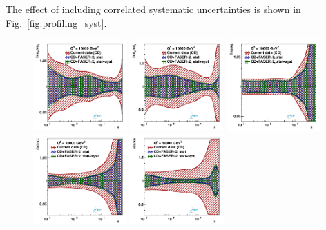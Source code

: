 %
The effect of including correlated systematic uncertainties is shown in 
Fig.~\ref{fig:profiling_syst}.
\begin{figure}[t]
\centering
\includegraphics[width=0.32\textwidth]{plots/proton_fasernu2/inclusive+charm_chargediscrimination/syst_FASERv2_q2_10000_pdf_uv_ratio.pdf}
\includegraphics[width=0.32\textwidth]{plots/proton_fasernu2/inclusive+charm_chargediscrimination/syst_FASERv2_q2_10000_pdf_dv_ratio.pdf}
\includegraphics[width=0.32\textwidth]{plots/proton_fasernu2/inclusive+charm_chargediscrimination/syst_FASERv2_q2_10000_pdf_g_ratio.pdf}\\
\includegraphics[width=0.32\textwidth]{plots/proton_fasernu2/inclusive+charm_chargediscrimination/syst_FASERv2_q2_10000_pdf_Sea_ratio.pdf}
\includegraphics[width=0.32\textwidth]{plots/proton_fasernu2/inclusive+charm_chargediscrimination/syst_FASERv2_q2_10000_pdf_s_ratio.pdf}

\end{figure}
